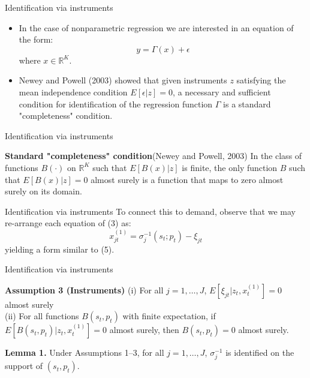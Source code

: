 \documentclass[aspectratio=169]{beamer}  %
\begin{document}
\begin{frame}{Identification via instruments}
    \begin{itemize}
    \item In the case of nonparametric regression we are interested in an equation of the form:
    \begin{equation}
        y = \Gamma(x) + \epsilon
    \end{equation}
    where \(x \in \mathbb{R}^K\). 
    \item  Newey and Powell (2003) showed that given instruments \(z\) satisfying the mean independence condition \(E[\epsilon|z] = 0\), a necessary and sufficient condition for identification of the regression function \(\Gamma\) is a standard "completeness" condition.
    \end{itemize}
\end{frame}

\begin{frame}{Identification via instruments}
    \begin{block}{\textbf{Standard "completeness" condition}(Newey and Powell, 2003)}
        In the class of functions \(B(\cdot)\) on \(\mathbb{R}^K\) such that \(E[B(x)|z]\) is finite, the only function \(B\) such that \(E[B(x)|z] = 0\) almost surely is a function that maps to zero almost surely on its domain. 
    \end{block}
\end{frame}

\begin{frame}{Identification via instruments}
    To connect this to demand, observe that we may re-arrange each equation of (3) as:
    \begin{equation}
        x_{jt}^{(1)} = \sigma_j^{-1}(s_t; p_t) - \xi_{jt}
    \end{equation}
    yielding a form similar to (5).
\end{frame}

\begin{frame}{Identification via instruments}
    \begin{block}{\textbf{Assumption 3 (Instruments)}}
       (i) For all \(j = 1, \ldots, J\), \(E[\xi_{jt} | z_t, x_t^{(1)}] = 0\) almost surely\\
       (ii) For all functions \(B(s_t, p_t)\) with finite expectation, if \(E[B(s_t, p_t) | z_t, x_t^{(1)}] = 0\) almost surely, then \(B(s_t, p_t) = 0\) almost surely.
    \end{block}
    \textbf{Lemma 1.} Under Assumptions 1--3, for all \(j = 1, \ldots, J\), \(\sigma_j^{-1}\) is identified on the support of \((s_t, p_t)\).
\end{frame}
\end{document}
